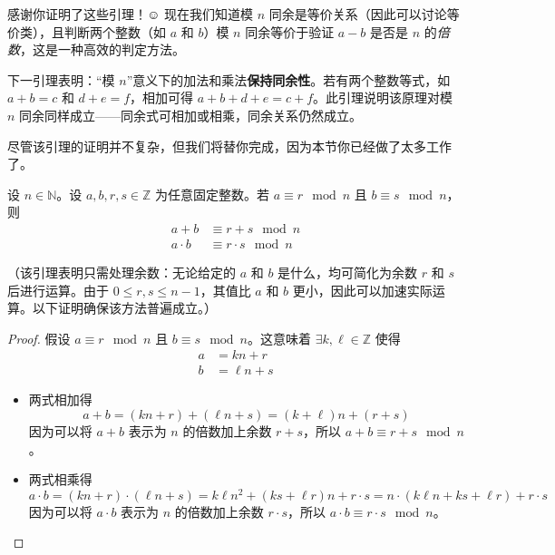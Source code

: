 感谢你证明了这些引理！$\smiley{}$ 现在我们知道模 $n$ 同余是等价关系（因此可以讨论等价类），且判断两个整数（如 $a$ 和 $b$）模 $n$ 同余等价于验证 $a - b$ 是否是 $n$ 的\emph{倍数}，这是一种高效的判定方法。

下一引理表明：``模 $n$''意义下的加法和乘法\textbf{保持同余性}。若有两个整数等式，如 $a + b = c$ 和 $d + e = f$，相加可得 $a + b + d + e = c + f$。此引理说明该原理对模 $n$ 同余同样成立——同余式可相加或相乘，同余关系仍然成立。

尽管该引理的证明并不复杂，但我们将替你完成，因为本节你已经做了太多工作了。

\begin{lemma}\label{lemma6.5.10}
    设 $n \in \mathbb{N}$。设 $a,b,r,s \in \mathbb{Z}$ 为任意固定整数。若 $a \equiv r \mod n$ 且 $b \equiv s \mod n$，则
    \begin{align*}
        a + b &\equiv r + s \mod n \\
        a \cdot b &\equiv r \cdot s \mod n
    \end{align*}
\end{lemma}

（该引理表明只需处理余数：无论给定的 $a$ 和 $b$ 是什么，均可简化为余数 $r$ 和 $s$ 后进行运算。由于 $0 \le r, s \le n - 1$，其值比 $a$ 和 $b$ 更小，因此可以加速实际运算。以下证明确保该方法普遍成立。）

\begin{proof}
    假设 $a \equiv r \mod n$ 且 $b \equiv s \mod n$。这意味着 $\exists k, \ell \in \mathbb{Z}$ 使得
    \begin{align*}
        a &= kn + r \\
        b &= \ell n + s
    \end{align*}
    \begin{itemize}
        \item 两式相加得
            \[a + b = (kn + r) + (\ell n + s) = (k + \ell)n + (r + s)\]
            因为可以将 $a+b$ 表示为 $n$ 的倍数加上余数 $r+s$，所以 $a + b \equiv r + s \mod n$。
        \item 两式相乘得
            \[a \cdot b =  (kn + r) \cdot (\ell n + s) = k\ell n^2 + (ks + \ell r)n + r \cdot s = n \cdot (k\ell n + ks + \ell r)+r \cdot s\]
            因为可以将 $a \cdot b$ 表示为 $n$ 的倍数加上余数 $r \cdot s$，所以 $a \cdot b \equiv r \cdot s \mod n$。
    \end{itemize}
\end{proof}

